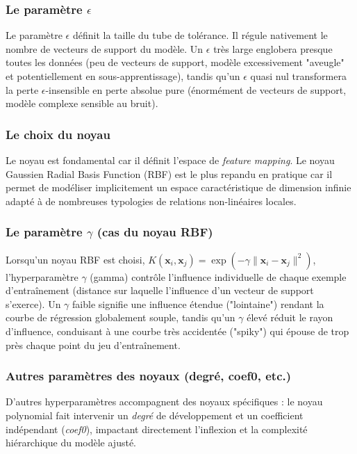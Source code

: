 \subsubsection{Le paramètre $\epsilon$}
Le paramètre $\epsilon$ définit la taille du tube de tolérance. Il régule nativement le nombre de vecteurs de support du modèle. Un $\epsilon$ très large englobera presque toutes les données (peu de vecteurs de support, modèle excessivement "aveugle" et potentiellement en sous-apprentissage), tandis qu'un $\epsilon$ quasi nul transformera la perte $\epsilon$-insensible en perte absolue pure (énormément de vecteurs de support, modèle complexe sensible au bruit).

\subsubsection{Le choix du noyau}
Le noyau est fondamental car il définit l'espace de \textit{feature mapping}. Le noyau Gaussien Radial Basis Function (RBF) est le plus repandu en pratique car il permet de modéliser implicitement un espace caractéristique de dimension infinie adapté à de nombreuses typologies de relations non-linéaires locales.

\subsubsection{Le paramètre $\gamma$ (cas du noyau RBF)}
Lorsqu'un noyau RBF est choisi, $K(\mathbf{x}_i, \mathbf{x}_j) = \exp(-\gamma \|\mathbf{x}_i - \mathbf{x}_j\|^2)$, l'hyperparamètre $\gamma$ (gamma) contrôle l'influence individuelle de chaque exemple d'entraînement (distance sur laquelle l'influence d'un vecteur de support s'exerce). Un $\gamma$ faible signifie une influence étendue ("lointaine") rendant la courbe de régression globalement souple, tandis qu'un $\gamma$ élevé réduit le rayon d'influence, conduisant à une courbe très accidentée ("spiky") qui épouse de trop près chaque point du jeu d'entraînement.

\subsubsection{Autres paramètres des noyaux (degré, coef0, etc.)}
D'autres hyperparamètres accompagnent des noyaux spécifiques : le noyau polynomial fait intervenir un \textit{degré} de développement et un coefficient indépendant (\textit{coef0}), impactant directement l'inflexion et la complexité hiérarchique du modèle ajusté.

